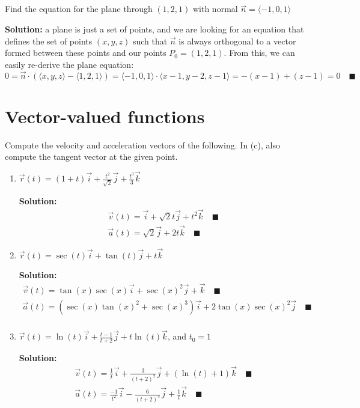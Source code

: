 \documentclass[letterpaper, 10pt]{article}
\begin{document}
\subsection{} Find the equation for the plane through $(1,2,1)$ with normal $\vec n = \langle -1, 0, 1 \rangle$
\par \textbf{Solution:} a plane is just a set of points, and we are looking for an equation that defines the set of points $(x,y,z)$ such that $\vec n$ is always orthogonal to a vector formed between these points and our points $P_0 = (1,2,1)$. From this, we can easily re-derive the plane equation:
\[  0 = \vec n \cdot (\langle x,y,z \rangle - \langle 1,2,1 \rangle) = \langle -1, 0, 1 \rangle \cdot \langle x-1,y-2,z-1 \rangle = -(x-1) + (z-1) = 0 \quad\blacksquare \]


\section{Vector-valued functions}
Compute the velocity and acceleration vectors of the following. In (c), also compute the tangent vector at the given point.
\begin{enumerate}[label = (\alph*)]
\item $\vec r (t) = (1 + t) \vec i + \frac{t^2}{\sqrt{2}} \vec j + \frac{t^3}{3} \vec k$
\par \textbf{Solution:}
\begin{gather*}
\vec v(t) = \vec i + \sqrt{2}t \vec j + t^2 \vec k \quad\blacksquare \\
\vec a(t) = \sqrt{2} \vec j + 2t \vec k \quad\blacksquare
\end{gather*}


\item $\vec r(t) = \sec(t) \vec i + \tan (t) \vec j + t\vec k$
\par \textbf{Solution:}
\begin{gather*}
\vec v(t) =  \tan(x)\sec(x) \vec i + \sec(x)^2 \vec j + \vec k \quad\blacksquare \\
\vec a(t) = (\sec(x)\tan(x)^2 + \sec(x)^3) \vec i + 2 \tan(x) \sec(x)^2 \vec j  \quad\blacksquare  \\
\end{gather*}

\item $\vec r(t) =  \ln(t) \vec i+\frac{t - 1}{t + 2} \vec j +t\ln(t) \vec k$, and $t_0 = 1$
\par \textbf{Solution:}
\begin{gather*}
\vec v(t) = \frac{1}{t} \vec i + \frac{3}{(t + 2)^2} \vec j +  (\ln(t) + 1) \vec k \quad\blacksquare \\
\vec a(t) = \frac{-1}{t^2} \vec i - \frac{6}{(t + 2)^3} \vec j + \frac{1}{t} \vec k \quad\blacksquare 
\end{gather*}

\end{enumerate}
\end{document}
